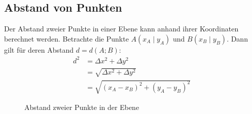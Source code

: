 \begin{regel}
 
\end{regel}

\begin{regel}
 
\end{regel}

\begin{regel}
 
\end{regel}


\subsection{Abstand von Punkten}

\begin{folg}
Der Abstand zweier Punkte in einer Ebene kann anhand ihrer Koordinaten berechnet werden. Betrachte die Punkte \(A(x_A\mid y_A)\) und \(B(x_B\mid y_B)\). Dann gilt für deren Abstand \(d=d(A;B)\):
\begin{align*}
 d^2 &= \Delta x^2 + \Delta y^2 \\ 
      &= \sqrt{\Delta x^2 + \Delta y^2} \\
      &= \sqrt{(x_A -x_B)^2 + (y_A - y_B)^2}
\end{align*}

\begin{figure}
\centering
\caption{Abstand zweier Punkte in der Ebene}
\end{figure}
\end{folg}

